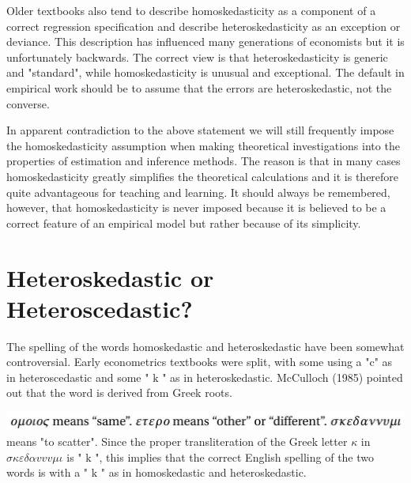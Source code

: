 \documentclass[10pt]{article}
\begin{document}
Older textbooks also tend to describe homoskedasticity as a component of a correct regression specification and describe heteroskedasticity as an exception or deviance. This description has influenced many generations of economists but it is unfortunately backwards. The correct view is that heteroskedasticity is generic and "standard", while homoskedasticity is unusual and exceptional. The default in empirical work should be to assume that the errors are heteroskedastic, not the converse.

In apparent contradiction to the above statement we will still frequently impose the homoskedasticity assumption when making theoretical investigations into the properties of estimation and inference methods. The reason is that in many cases homoskedasticity greatly simplifies the theoretical calculations and it is therefore quite advantageous for teaching and learning. It should always be remembered, however, that homoskedasticity is never imposed because it is believed to be a correct feature of an empirical model but rather because of its simplicity.

\section{Heteroskedastic or Heteroscedastic?}
The spelling of the words homoskedastic and heteroskedastic have been somewhat controversial. Early econometrics textbooks were split, with some using a "c" as in heteroscedastic and some " $\mathrm{k}$ " as in heteroskedastic. McCulloch (1985) pointed out that the word is derived from Greek roots.

\includegraphics[max width=\textwidth]{2022_09_17_efa0deee3441d06e0b66g-17}\\
means "to scatter". Since the proper transliteration of the Greek letter $\kappa$ in $\sigma \kappa \varepsilon \delta \alpha v v v \mu \iota$ is " $\mathrm{k}$ ", this implies that the correct English spelling of the two words is with a " $\mathrm{k}$ " as in homoskedastic and heteroskedastic.
\end{document}
